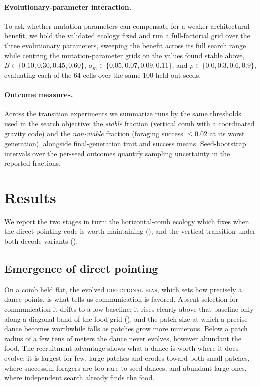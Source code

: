 \documentclass[11pt]{article}
\newcommand{\trait}[1]{\textsc{#1}}
\begin{document}
\paragraph{Evolutionary-parameter interaction.}
To ask whether mutation parameters can compensate for a weaker architectural
benefit, we hold the validated ecology fixed and run a full-factorial grid over
the three evolutionary parameters, sweeping the benefit across its full search
range while centring the mutation-parameter grids on the values found stable
above,
$B \in \{0.10, 0.30, 0.45, 0.60\}$, $\sigma_m \in \{0.05, 0.07, 0.09, 0.11\}$, and
$\rho \in \{0.0, 0.3, 0.6, 0.9\}$, evaluating each of the $64$ cells over the same
$100$ held-out seeds.

\paragraph{Outcome measures.}
Across the transition experiments we summarize runs by the same thresholds used in
the search objective: the \emph{stable} fraction (vertical comb with a coordinated
gravity code) and the \emph{non-viable} fraction (foraging success $\le 0.02$ at its
worst generation), alongside
final-generation trait and success means. Seed-bootstrap intervals over the
per-seed outcomes quantify sampling uncertainty in the reported fractions.

\section{Results}
\label{sec:results}

We report the two stages in turn: the horizontal-comb ecology which fixes when the
direct-pointing code is worth maintaining (), and the
vertical transition under both decode variants ().

\subsection{Emergence of direct pointing}
\label{sec:results-horizontal}
On a comb held flat, the evolved \trait{directional bias}, which sets how precisely
a dance points, is what tells us communication is favored. Absent selection for
communication it drifts to a low baseline; it rises clearly above that baseline
only along a diagonal band of the food grid (), and the
patch size at which a precise dance becomes worthwhile falls as patches grow more
numerous. Below a patch radius of a few tens of meters the dance never evolves,
however abundant the food. The recruitment advantage shows what a dance is worth
where it does evolve: it is largest for few, large patches and erodes toward both
small patches, where successful foragers are too rare to seed dances, and abundant
large ones, where independent search already finds the food.
\end{document}
